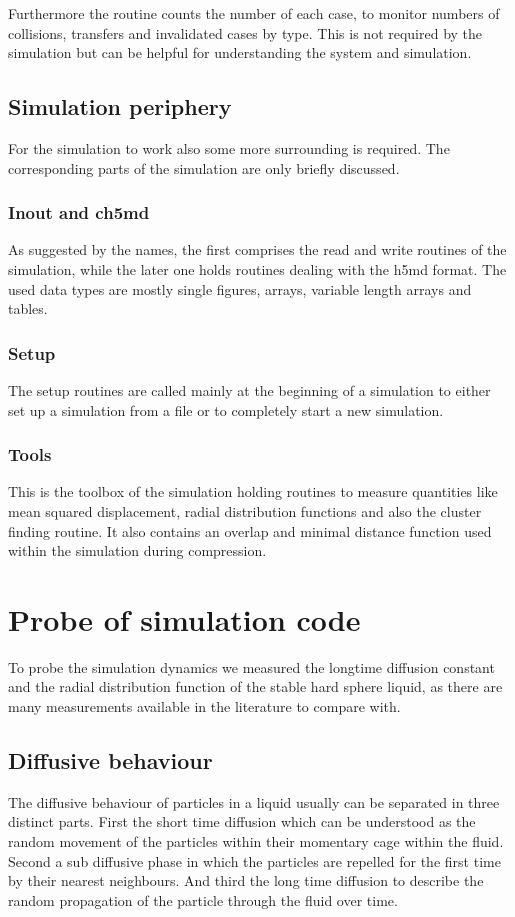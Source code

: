 Furthermore the routine counts the number of each case, to monitor numbers of collisions, transfers and invalidated cases by type. This is not required by the simulation but can be helpful for understanding the system and simulation.\\

\subsection{Simulation periphery}
For the simulation to work also some more surrounding is required. The corresponding parts of the simulation are only briefly discussed.
 
\subsubsection{Inout and ch5md}
As suggested by the names, the first comprises the read and write routines of the simulation, while the later one holds routines dealing with the h5md format. The used data types are mostly single figures, arrays, variable length arrays and tables.

\subsubsection{Setup}
The setup routines are called mainly at the beginning of a simulation to either set up a simulation from a file or to completely start a new simulation.

\subsubsection{Tools}
This is the toolbox of the simulation holding routines to measure quantities like mean squared displacement, radial distribution functions and also the cluster finding routine. It also contains an overlap and minimal distance function used within the simulation during compression.

\section{Probe of simulation code}
\label{sec:probe}
To probe the simulation dynamics we measured the longtime diffusion constant and the radial distribution function of the stable hard sphere liquid, as there are many measurements available in the literature to compare with.

\subsection{Diffusive behaviour}
\label{sec:diffusion_probe}
The diffusive behaviour of particles in a liquid usually can be separated in three distinct parts. First the short time diffusion which can be understood as the random movement of the particles within their momentary cage within the fluid. Second a sub diffusive phase in which the particles are repelled for the first time by their nearest neighbours. And third the long time diffusion to describe the random propagation of the particle through the fluid over time.\\
   
